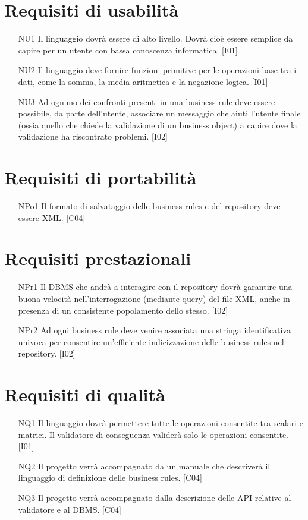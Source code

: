 \documentclass[11pt,titlepage,a4paper]{report}
\begin{document}
\section{Requisiti di usabilit\`a}
\begin{itemize}
\item[NU1]{Il linguaggio dovr\`a essere di alto livello. Dovr\`a cio\`e essere semplice da capire per un utente con bassa conoscenza informatica. [I01]}
\item[NU2]{Il linguaggio deve fornire funzioni primitive per le operazioni base tra i dati, come la somma, la media aritmetica e la negazione logica. [I01]}
\item[NU3]{Ad ognuno dei confronti presenti in una business rule deve essere possibile, da parte dell'utente, associare un messaggio che aiuti l'utente finale (ossia quello che chiede la validazione di un business object) a capire dove la validazione ha riscontrato problemi. [I02]}
\end{itemize}

\section{Requisiti di portabilit\`a}
\begin{itemize}
\item[NPo1]{Il formato di salvataggio delle business rules e del repository deve essere XML. [C04]}
\end{itemize}
\section{Requisiti prestazionali}
\begin{itemize}
 \item[NPr1]{Il DBMS che andr\`a a interagire con il repository dovr\`a garantire una buona velocit\`a nell'interrogazione (mediante query) del file XML, anche in presenza di un consistente popolamento dello stesso. [I02]}
\item[NPr2]{Ad ogni business rule deve venire associata una stringa identificativa univoca per consentire un'efficiente indicizzazione delle business rules nel repository. [I02]}
\end{itemize}

\section{Requisiti di qualit\`a}
\begin{itemize}
\item[NQ1]{Il linguaggio dovr\`a permettere tutte le operazioni consentite tra scalari e matrici. Il validatore di conseguenza valider\`a solo le operazioni consentite. [I01]}
\item[NQ2]{Il progetto verr\`a accompagnato da un manuale che descriver\`a il linguaggio di definizione delle business rules. [C04]}
\item[NQ3]{Il progetto verr\`a accompagnato dalla descrizione delle API relative al validatore e al DBMS. [C04]}
\end{itemize}
\newpage
\end{document}
